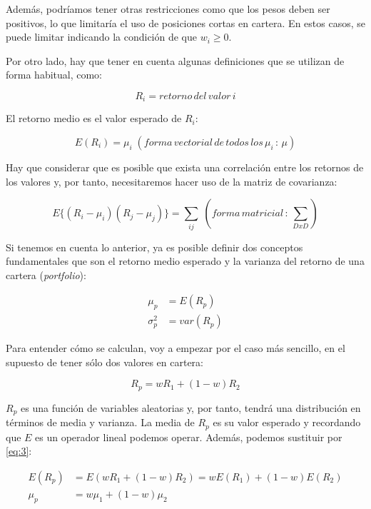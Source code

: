 Además, podríamos tener otras restricciones como que los pesos deben ser positivos, lo que limitaría el uso de posiciones cortas \citep{wiki:posicion_corta} en cartera. En estos casos, se puede limitar indicando la condición de que $w_{i} \geq 0$. 

Por otro lado, hay que tener en cuenta algunas definiciones que se utilizan de forma habitual, como:

\begin{equation*}
	R_{i} = retorno\, del\, valor\, i
\end{equation*}

El retorno medio es el valor esperado de $R_{i}$:

\begin{equation}
	E(R_{i}) = \mu_{i}\;  (forma\, vectorial\, de\, todos\, los\, \mu_{i}\, :\, \mu)
\end{equation}

Hay que considerar que es posible que exista una correlación entre los retornos de los valores y, por tanto, necesitaremos hacer uso de la matriz de covarianza:

\begin{equation}
	E\{(R_{i}-\mu_{i}) (R_{j}-\mu_{j})\} = \sum_{ij}\;  (forma\, matricial\, :\, \sum_{DxD})
\end{equation}

Si tenemos en cuenta lo anterior, ya es posible definir dos conceptos fundamentales que son el retorno medio esperado y la varianza del retorno de una cartera (\emph{portfolio}):

\begin{align} \label{eq:3}
	\mu_{p} &= E(R_{p})\\
	\sigma_{p}^{2} &= var(R_{p})
\end{align}

Para entender cómo se calculan, voy a empezar por el caso más  sencillo, en el supuesto de tener sólo dos valores en cartera:

\begin{equation} \label{eq:4}
	R_{p} = wR_{1} + (1 - w)R_{2}
\end{equation}

$R_{p}$ es una función de variables aleatorias y, por tanto, tendrá una distribución en términos de media y varianza. La media de $R_{p}$ es su valor esperado y recordando que $E$ es un operador lineal podemos operar. Además, podemos sustituir por \ref{eq:3}:

\begin{align} 
    E(R_{p}) &= E(wR_{1} + (1-w)R_{2}) = wE(R_{1}) + (1-w)E(R_{2}) \\
    \mu_{p}  &= w\mu_{1} + (1-w)\mu_{2}
    \label{eq:5}
\end{align}

